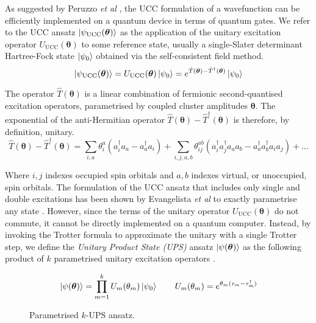 As suggested by Peruzzo \textit{et al} \cite{Peruzzo2014}, the UCC formulation of a wavefunction can be efficiently implemented on a quantum device in terms of quantum gates. We refer to the UCC ansatz $\ket{\psi_{\text{UCC}}(\bm\theta)}$ as the application of the unitary excitation operator $U_\text{UCC}(\bm\theta)$ to some reference state, usually a single-Slater determinant Hartree-Fock state $\ket{\psi_0}$ obtained via the self-consistent field method.
\begin{equation*}
    \ket{\psi_{\text{UCC}}(\bm\theta)} = U_\text{UCC}(\bm\theta) \ket{\psi_0} =
    e^{\hat T(\bm\theta) - \hat T^\dagger(\bm\theta)} \ket{\psi_0}
\end{equation*}

The operator $\hat T(\bm\theta)$ is a linear combination of fermionic second-quantised excitation operators, parametrised by coupled cluster amplitudes $\bm\theta$. The exponential of the anti-Hermitian operator $\hat T(\bm\theta) - \hat T^\dagger(\bm\theta)$ is therefore, by definition, unitary. 
\begin{equation*}
\hat T(\bm{\theta}) - \hat T^{\dagger}(\bm{\theta}) =
\sum_{i, a} \theta^a_i (a^\dagger_i a_a - a^\dagger_a a_i) + 
\sum_{i, j, a, b} \theta^{ab}_{ij} (a^\dagger_i a^\dagger_j a_a a_b - a^\dagger_a a^\dagger_b a_i a_j) + \dots
\end{equation*}

Where $i, j$ indexes occupied spin orbitals and $a, b$ indexes virtual, or unoccupied, spin orbitals. The formulation of the UCC ansatz that includes only single and double excitations has been shown by Evangelista \textit{et al} to exactly parametrise any state \cite{Evangelista2019}. However, since the terms of the unitary operator $U_\text{UCC}(\bm\theta)$ do not commute, it cannot be directly implemented on a quantum computer. Instead, by invoking the Trotter formula to approximate the unitary with a single Trotter step, we define the \textit{Unitary Product State (UPS)} ansatz $\ket{\psi(\bm\theta)}$ as the following product of $k$ parametrised unitary excitation operators \cite{Burton2023}.

\begin{figure}[H]
    \centering
    \begin{equation*}
        \ket{\psi(\bm\theta)} = \prod_{m=1}^k U_m(\theta_m) \ket{\psi_0} \qquad
        U_m(\theta_m) = e^{\theta_m (\tau_m - \tau_m^\dagger)}
    \end{equation*}
    \caption{Parametrised $k$-UPS ansatz.}
\end{figure}

